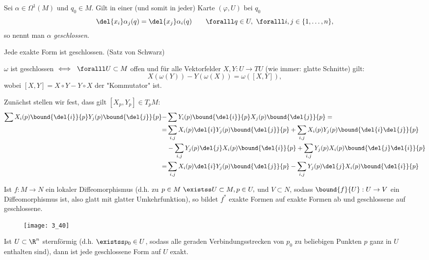 \begin{defn}
	Sei $ \alpha \in \Omega^1(M) $ und $q_0 \in M$. Gilt in einer (und somit in jeder) Karte $ (\varphi,U)$ bei $ q_0 $
	\[ \del{x_i} \alpha_j (q) = \del{x_j} \alpha_i(q) \qquad \foralll q \in U,\ \foralll i,j \in \{1,\dotsc,n\}, \]
	so nennt man $\alpha$ \emph{geschlossen}.
\end{defn}

\begin{rem*}
	Jede exakte Form ist geschlossen. (Satz von Schwarz)
\end{rem*}

\begin{lem}
	$\omega$ ist geschlossen $\iff \ \foralll U \subset M$ offen und für alle Vektorfelder $X,Y: U \to TU$ (wie immer: glatte Schnitte) gilt:
	\[ X(\omega(Y)) - Y(\omega(X)) = \omega([X,Y]), \]
	wobei $[X,Y] = X \circ Y - Y \circ X$ der "Kommutator" ist.
\end{lem}

\begin{rem*}
	Zunächst stellen wir fest, dass gilt $ [X_p,Y_p] \in T_pM: $
	\begin{align*}
		\sum X_i(p) \bound{\del{i}}{p} Y_j(p) \bound{\del{j}}{p} -& \sum Y_i(p) \bound{\del{i}}{p} X_j(p) \bound{\del{j}}{p} = \\
		=&\sum_{i,j} X_i(p) \del{i} Y_j(p) \bound{\del{j}}{p} + \sum_{i,j} X_i(p) Y_j(p) \bound{\del{i} \del{j}}{p}\\
		&- \sum_{i,j} Y_j(p) \del{j} X_i(p) \bound{\del{i}}{p} + \sum_{i,j} Y_j(p) X_i(p) \bound{\del{j} \del{i}}{p}\\
		=& \sum_{i,j} X_i(p) \del{i} Y_j(p) \bound{\del{j}}{p} - \sum_{i,j} Y_j(p) \del{j} X_i(p) \bound{\del{i}}{p}
	\end{align*}
\end{rem*}

\begin{rem}
	Ist $ f: M \to N $ ein lokaler Diffeomorphismus (d.h. zu $p \in M \ \existss U \subset M, p \in U,$ und $V \subset N$, sodass $ \bound{f}{U}: U \to V $ ein Diffeomorphismus ist, also glatt mit glatter Umkehrfunktion), so bildet $f^*$ exakte Formen auf exakte Formen ab und geschlossene auf geschlossene.
\end{rem}

\begin{thm}
	\begin{minipage}{\linewidth}
		\begin{wrapfigure}{R}{5cm}
			\centering
			\texttt{[image: 3\_40]}
		\end{wrapfigure}
		
		Ist $ U \subset \R^n $ sternförmig (d.h. $\existss p_0 \in U$, sodass alle geraden Verbindungsstrecken von $p_0$ zu beliebigen Punkten $p$ ganz in $U$ enthalten sind), dann ist jede geschlossene Form auf $U$ exakt.
	\end{minipage}
\end{thm}

